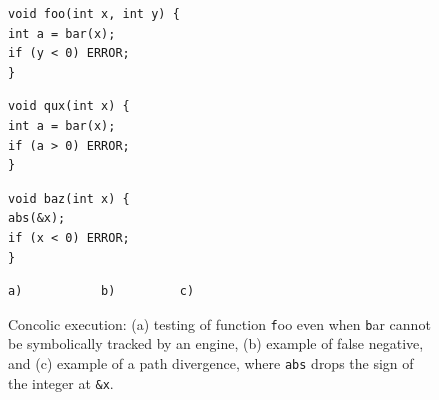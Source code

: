 \begin{figure}[t]
	\vspace{-2.5mm}
	\begin{minipage}{.30\textwidth}
		\begin{lstlisting}[basicstyle=\ttfamily\scriptsize]
void foo(int x, int y) {
int a = bar(x);
if (y < 0) ERROR;
} 
		\end{lstlisting}
		\vspace{-4mm}
	\end{minipage}%
	\hspace{5mm}
	\begin{minipage}{.30\textwidth}
		\begin{lstlisting}[basicstyle=\ttfamily\scriptsize]
void qux(int x) {
int a = bar(x);
if (a > 0) ERROR;
} 
		\end{lstlisting}
		\vspace{-4mm}
	\end{minipage}%
	\hspace{5mm}
	\begin{minipage}{.30\textwidth}
		\begin{lstlisting}[basicstyle=\ttfamily\scriptsize]
void baz(int x) {
abs(&x);
if (x < 0) ERROR;
}   
		\end{lstlisting}
		\vspace{-4mm}
	\end{minipage}%
\begin{Verbatim}[obeytabs]
	a)		     b)			c)
\end{Verbatim}
	\vspace{+2pt}
	\caption{Concolic execution: (a) testing of function {\texttt foo} even when {\texttt bar} cannot be symbolically tracked by an engine, (b) example of false negative, and (c) example of a path divergence, where \texttt{abs} drops the sign of the integer at \texttt{\&x}.
	}
	\label{fig:example-concolic-problems}
	\vspace{-3mm}
\end{figure}




